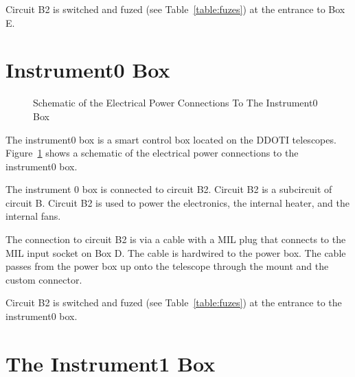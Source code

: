 Circuit B2 is switched and fuzed (see Table~\ref{table:fuzes}) at the entrance to Box E.

\fi

\ifddoti

\section{Instrument0 Box}

\begin{figure}
\begin{center}
\footnotesize 
{}
\end{center}
\caption{Schematic of the Electrical Power Connections To The Instrument0 Box}
\label{figure:schematic-electrical-power-instrument0-box}
\end{figure}

The instrument0 box is a smart control box located on the DDOTI telescopes. Figure~\ref{figure:schematic-electrical-power-instrument0-box} shows a schematic of the electrical power connections to the instrument0 box.

The instrument 0 box is connected to circuit B2. Circuit B2 is a subcircuit of circuit B. Circuit B2 is used to power the electronics, the internal heater, and the internal fans.

The connection to circuit B2 is via a cable with a MIL plug that connects to the MIL input socket on Box D. The cable is hardwired to the power box. The cable passes from the power box up onto the telescope through the mount and the custom connector.

Circuit B2 is switched and fuzed (see Table~\ref{table:fuzes}) at the entrance to the instrument0 box.

\section{The Instrument1 Box}

